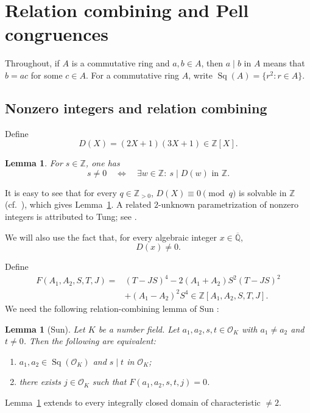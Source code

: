 \documentclass[12pt]{amsart}
\numberwithin{equation}{section}
\newtheorem{lemma}[theorem]{Lemma}
\theoremstyle{remark}
\theoremstyle{plain}
\newcommand{\Z}{\mathbb{Z}}
\newcommand{\Q}{\mathbb{Q}}
\newcommand{\sO}{\mathcal{O}}
\newcommand{\Sq}[1]{\operatorname{Sq}(#1)}
\begin{document}
\section{Relation combining and Pell congruences}\label{sec:prel}
Throughout, if $A$ is a commutative ring and $a,b\in A$, then $a\mid b$ in $A$ means that $b=ac$ for some $c\in A$. For a commutative ring $A$, write $\Sq{A}=\{r^2\colon r\in A\}$.

\subsection{Nonzero integers and relation combining}\label{sec:comb}
Define
\[
D(X)=(2X+1)(3X+1)\in\Z[X].
\]
\begin{lemma}\label{lem:DL}
For $s\in\Z$, one has
\[
s\neq0\quad\Longleftrightarrow\quad\exists w\in\Z\colon\ s\mid D(w)\text{ in }\Z.
\]
\end{lemma}

It is easy to see that for every $q\in\Z_{>0}$, $D(X)\equiv0\pmod{q}$ is solvable in $\Z$ (cf.~\cite[Problem~202]{Sierpinski70}), which gives Lemma~\ref{lem:DL}. A related $2$-unknown parametrization of nonzero integers is attributed to Tung; see \cite[Lemma~3.4]{MS27}.

We will also use the fact that, for every algebraic integer $x\in\overline{\Q}$,
\begin{equation}\label{eq:Dnonzero}
D(x)\neq0.
\end{equation}

Define
\begin{align*}
F(A_1,A_2,S,T,J)={}&(T-JS)^4-2(A_1+A_2)S^2(T-JS)^2 \\
& +(A_1-A_2)^2S^4\in\Z[A_1,A_2,S,T,J].
\end{align*}
We need the following relation-combining lemma of Sun \cite[Lemma~2.2]{Sun26}:
\begin{lemma}[Sun]\label{lem:F}
Let $K$ be a number field. Let $a_1,a_2,s,t\in\sO_K$ with $a_1\neq a_2$ and $t\neq0$. Then the following are equivalent:
\begin{enumerate}[label=\textup{(\roman*)}]
\item $a_1,a_2\in\Sq{\sO_K}$ and $s\mid t$ in $\sO_K$;
\item there exists $j\in\sO_K$ such that $F(a_1,a_2,s,t,j)=0$.
\end{enumerate}
\end{lemma}
Lemma~\ref{lem:F} extends to every integrally closed domain of characteristic $\neq2$.
\end{document}
